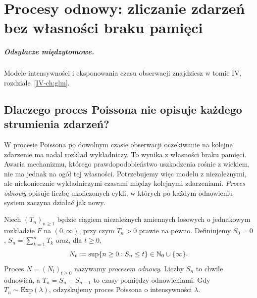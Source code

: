 \chapter{Procesy odnowy: zliczanie zdarzeń bez własności braku pamięci}
\label{ch:renewal}
\paragraph{Odsyłacze międzytomowe.} Modele intensywności i eksponowania czasu obserwacji znajdziesz w tomie IV, rozdziale~\ref{IV-ch:glm}.


\section{Dlaczego proces Poissona nie opisuje każdego strumienia zdarzeń?}
W procesie Poissona po dowolnym czasie obserwacji oczekiwanie na
kolejne zdarzenie ma nadal rozkład wykładniczy. To wynika z własności
braku pamięci. Awaria mechanizmu, którego prawdopodobieństwo
uszkodzenia rośnie z wiekiem, nie ma jednak na ogół tej własności.
Potrzebujemy więc modelu z niezależnymi, ale niekoniecznie
wykładniczymi czasami między kolejnymi zdarzeniami.
\emph{Proces odnowy} opisuje liczbę ukończonych cykli, w których
po każdym odnowieniu system zaczyna działać jak nowy.

\begin{definicja}
Niech $(T_n)_{n\ge1}$ będzie ciągiem niezależnych zmiennych
losowych o jednakowym rozkładzie $F$ na $(0,\infty)$, przy czym
$T_n>0$ prawie na pewno. Definiujemy $S_0=0$,
$S_n=\sum_{k=1}^nT_k$ oraz, dla $t\ge0$,
\[
N_t:=\sup\{n\ge0:S_n\le t\}\in\mathbb{N}_0\cup\{\infty\}.
\]
Proces $N=(N_t)_{t\ge0}$ nazywamy \emph{procesem odnowy}.
Liczby $S_n$ to chwile odnowień, a $T_n=S_n-S_{n-1}$
to czasy pomiędzy odnowieniami. Gdy $T_n\sim\mathrm{Exp}(\lambda)$,
odzyskujemy proces Poissona o intensywności $\lambda$.
\end{definicja}


